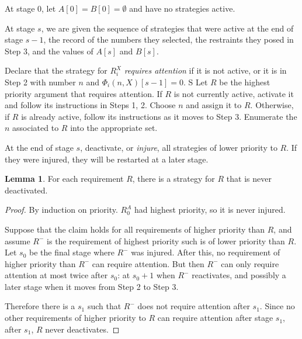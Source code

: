 \documentclass[12pt]{report}
\newcommand{\dfn}[1]{\emph{#1}\index{#1}}
\theoremstyle{definition}
\newtheorem{lemma}[theorem]{Lemma}
\begin{document}
At stage $0$, let $A[0] = B[0] = \emptyset$ and have no strategies active.

At stage $s$, we are given the sequence of strategies that were active at the end of stage $s - 1$, the record of the numbers they selected, the restraints they posed in Step 3, and the values of $A[s]$ and $B[s]$.

Declare that the strategy for $R_i^X$ \dfn{requires attention} if it is not active, or it is in Step 2 with number $n$ and $\Phi_i(n, X)[s - 1] = 0$. S
Let $R$ be the highest priority argument that requires attention.
If $R$ is not currently active, activate it and follow its instructions in Steps 1, 2. Choose $n$ and assign it to $R$.
Otherwise, if $R$ is already active, follow its instructions as it moves to Step 3. Enumerate the $n$ associated to $R$ into the appropriate set.

At the end of stage $s$, deactivate, or \dfn{injure}, all strategies of lower priority to $R$. If they were injured, they will be restarted at a later stage.

\begin{lemma}
For each requirement $R$, there is a strategy for $R$ that is never deactivated.
\end{lemma}
\begin{proof}
By induction on priority. $R_0^A$ had highest priority, so it is never injured.

Suppose that the claim holds for all requirements of higher priority than $R$, and assume $R^-$ is the requirement of highest priority such is of lower priority than $R$.
Let $s_0$ be the final stage where $R^-$ was injured.
After this, no requirement of higher priority than $R^-$ can require attention.
But then $R^-$ can only require attention at most twice after $s_0$: at $s_0 + 1$ when $R^-$ reactivates, and possibly a later stage when it moves from Step 2 to Step 3.

Therefore there is a $s_1$ such that $R^-$ does not require attention after $s_1$.
Since no other requirements of higher priority to $R$ can require attention after stage $s_1$, after $s_1$, $R$ never deactivates.
\end{proof}
\end{document}
